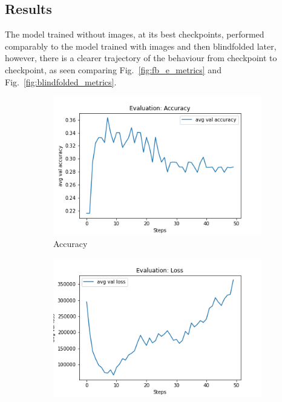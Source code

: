 \subsection{Results}
The model trained without images, at its best checkpoints, performed comparably to the model trained with images and then blindfolded later, however, there is a clearer trajectory of the behaviour from checkpoint to checkpoint, as seen comparing Fig.~\ref{fig:fb_e_metrics} and Fig.~\ref{fig:blindfolded_metrics}. 

\begin{figure}[H]
     \centering
     \begin{subfigure}[b]{0.3\textwidth}
         \centering
         \includegraphics[width=\textwidth]{./figure/results/fully_blinded/eval/avg val accuracy.png}
         \caption{Accuracy}
         \label{fig:fb_e_accuracy}
     \end{subfigure}
     \hfill
     \begin{subfigure}[b]{0.3\textwidth}
         \centering
         \includegraphics[width=\textwidth]{./figure/results/fully_blinded/eval/avg val loss.png}

\end{subfigure}
\end{figure}
